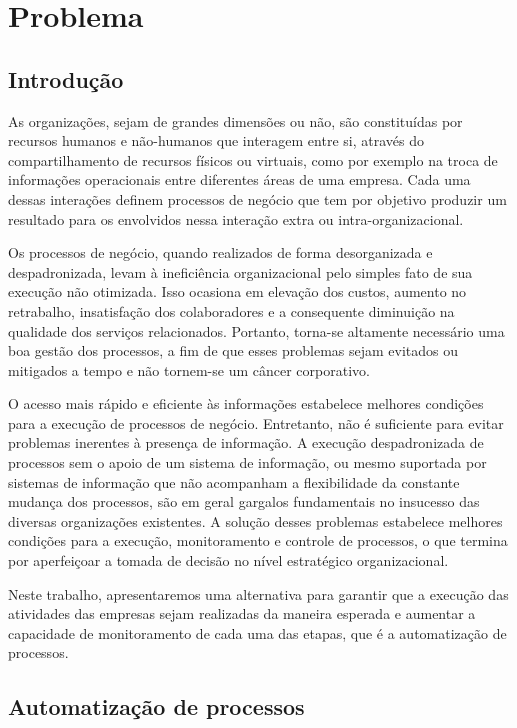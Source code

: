 \chapter{Problema}\label{chp:problema}

\section{Introdução}\label{sec:problema-introducao}

As organizações, sejam de grandes dimensões ou não, são constituídas por recursos humanos e não-humanos que interagem entre si, através do compartilhamento de recursos físicos ou virtuais, como por exemplo na troca de informações operacionais entre diferentes áreas de uma empresa. Cada uma dessas interações definem processos de negócio que tem por objetivo produzir um resultado para os envolvidos nessa interação extra ou intra-organizacional.

Os processos de negócio, quando realizados de forma desorganizada e despadronizada, levam à ineficiência organizacional pelo simples fato de sua execução não otimizada. Isso ocasiona em elevação dos custos, aumento no retrabalho, insatisfação dos colaboradores e a consequente diminuição na qualidade dos serviços relacionados. Portanto, torna-se altamente necessário uma boa gestão dos processos, a fim de que esses problemas sejam evitados ou mitigados a tempo e não tornem-se um câncer corporativo.

O acesso mais rápido e eficiente às informações estabelece melhores condições para a execução de processos de negócio. Entretanto, não é suficiente para evitar problemas inerentes à presença de informação. A execução despadronizada de processos sem o apoio de um sistema de informação, ou mesmo suportada por sistemas de informação que não acompanham a flexibilidade da constante mudança dos processos, são em geral gargalos fundamentais no insucesso das diversas organizações existentes. A solução desses problemas estabelece melhores condições para a execução, monitoramento e controle de processos, o que termina por aperfeiçoar a tomada de decisão no nível estratégico organizacional.

Neste trabalho, apresentaremos uma alternativa para garantir que a execução das atividades das empresas sejam realizadas da maneira esperada e aumentar a capacidade de monitoramento de cada uma das etapas, que é a automatização de processos. 

\section{Automatização de processos}\label{sec:problema-automatizacao_processos}



